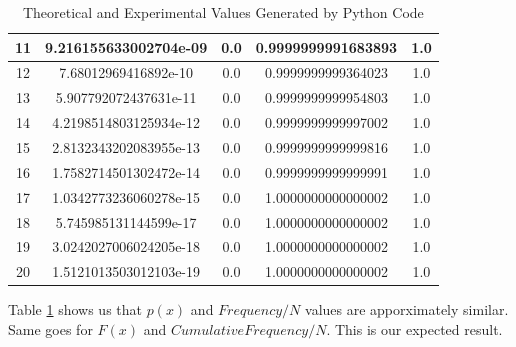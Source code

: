 \documentclass[12pt]{article}
\begin{document}
\begin{center}
\begin{table}[H]
\begin{tabular}{ | c | c | c | c | c | }
			11 & 9.216155633002704e-09  & 0.0         & 0.9999999991683893  & 1.0                    \\
			\hline

			12 & 7.68012969416892e-10   & 0.0         & 0.9999999999364023  & 1.0                    \\
			\hline

			13 & 5.907792072437631e-11  & 0.0         & 0.9999999999954803  & 1.0                    \\
			\hline

			14 & 4.2198514803125934e-12 & 0.0         & 0.9999999999997002  & 1.0                    \\
			\hline

			15 & 2.8132343202083955e-13 & 0.0         & 0.9999999999999816  & 1.0                    \\
			\hline

			16 & 1.7582714501302472e-14 & 0.0         & 0.9999999999999991  & 1.0                    \\
			\hline

			17 & 1.0342773236060278e-15 & 0.0         & 1.0000000000000002  & 1.0                    \\
			\hline

			18 & 5.745985131144599e-17  & 0.0         & 1.0000000000000002  & 1.0                    \\
			\hline

			19 & 3.0242027006024205e-18 & 0.0         & 1.0000000000000002  & 1.0                    \\
			\hline

			20 & 1.5121013503012103e-19 & 0.0         & 1.0000000000000002  & 1.0                    \\
			\hline
		\end{tabular}
		\caption{\label{tab:data-table}Theoretical and Experimental Values Generated by Python Code}
	\end{table}
\end{center}



Table \ref{tab:data-table} shows us that $p(x)$ and $Frequency/N$ values are apporximately similar. Same goes for $F(x)$ and $Cumulative Frequency/ N$. This is our expected result.
\end{document}
